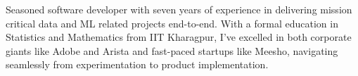 \par{
    Seasoned software developer with seven years of experience in delivering mission critical data and ML related projects end-to-end. With a formal education in Statistics and Mathematics from IIT Kharagpur, I've excelled in both corporate giants like Adobe and Arista and fast-paced startups like Meesho, navigating seamlessly from experimentation to product implementation.
}